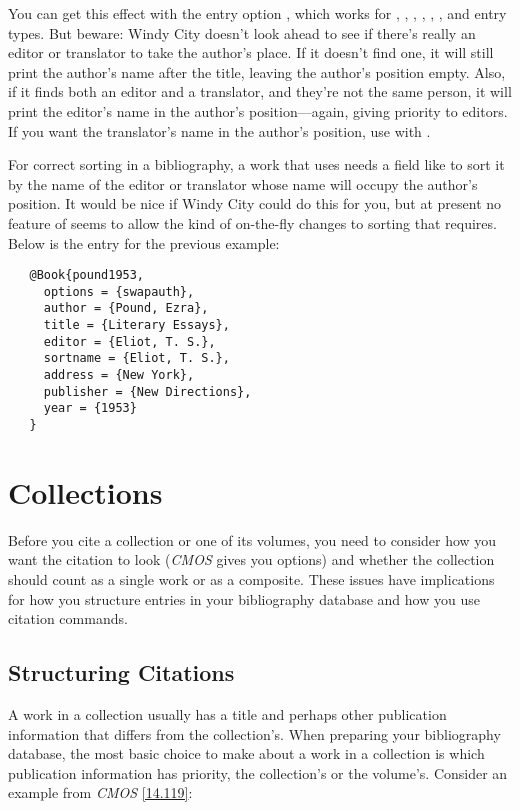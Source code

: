 \documentclass[11pt,letterpaper,oneside]{article}
\begin{document}
\noindent You can get this effect with the entry option
, which works for , ,
, , ,
, and  entry types. But beware:
Windy City doesn't look ahead to see if there's really an editor or
translator to take the author's place. If it doesn't find one, it will
still print the author's name after the title, leaving the author's
position empty. Also, if it finds both an editor and a translator, and
they're not the same person, it will print the editor's name in the
author's position---again, giving priority to editors. If you want the
translator's name in the author's position, use  with
.

For correct sorting in a bibliography, a work that uses 
needs a field like  to sort it by the name of the
editor or translator whose name will occupy the author's position. It
would be nice if Windy City could do this for you, but at present no
feature of \biblatex seems to allow the kind of on-the-fly changes to
sorting that  requires. Below is the entry for the
previous example:

\begin{verbatim}
   @Book{pound1953,
     options = {swapauth},
     author = {Pound, Ezra},
     title = {Literary Essays},
     editor = {Eliot, T. S.},
     sortname = {Eliot, T. S.},
     address = {New York},
     publisher = {New Directions},
     year = {1953}
   }
\end{verbatim}

\section{Collections}
\label{collections}

Before you cite a collection or one of its volumes, you need to
consider how you want the citation to look (\textit{CMOS} gives you
options) and whether the collection should count as a single work or
as a composite. These issues have implications for how you structure
entries in your bibliography database and how you use citation
commands.

\subsection{Structuring Citations}
\label{collorder}

A work in a collection usually has a title and perhaps other
publication information that differs from the collection's. When
preparing your bibliography database, the most basic choice to make
about a work in a collection is which publication information has
priority, the collection's or the volume's. Consider an example from
\textit{CMOS} \ref{14.119}:
\end{document}

